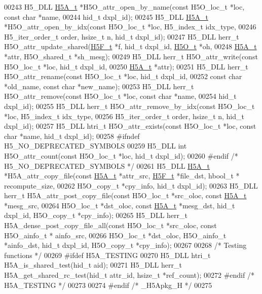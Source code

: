 \begin{DoxyCode}
00243 H5\_DLL \hyperlink{struct_h5_a__t}{H5A\_t} *H5O\_attr\_open\_by\_name(\textcolor{keyword}{const} H5O\_loc\_t *loc, \textcolor{keyword}{const} \textcolor{keywordtype}{char} *name,
00244     hid\_t dxpl\_id);
00245 H5\_DLL \hyperlink{struct_h5_a__t}{H5A\_t} *H5O\_attr\_open\_by\_idx(\textcolor{keyword}{const} H5O\_loc\_t *loc, H5\_index\_t idx\_type,
00246     H5\_iter\_order\_t order, hsize\_t n, hid\_t dxpl\_id);
00247 H5\_DLL herr\_t H5O\_attr\_update\_shared(\hyperlink{struct_h5_f__t}{H5F\_t} *f, hid\_t dxpl\_id, \hyperlink{struct_h5_o__t}{H5O\_t} *oh,
00248         \hyperlink{struct_h5_a__t}{H5A\_t} *attr, H5O\_shared\_t *sh\_mesg);
00249 H5\_DLL herr\_t H5O\_attr\_write(\textcolor{keyword}{const} H5O\_loc\_t *loc, hid\_t dxpl\_id,
00250     \hyperlink{struct_h5_a__t}{H5A\_t} *attr);
00251 H5\_DLL herr\_t H5O\_attr\_rename(\textcolor{keyword}{const} H5O\_loc\_t *loc, hid\_t dxpl\_id,
00252     \textcolor{keyword}{const} \textcolor{keywordtype}{char} *old\_name, \textcolor{keyword}{const} \textcolor{keywordtype}{char} *new\_name);
00253 H5\_DLL herr\_t H5O\_attr\_remove(\textcolor{keyword}{const} H5O\_loc\_t *loc, \textcolor{keyword}{const} \textcolor{keywordtype}{char} *name,
00254     hid\_t dxpl\_id);
00255 H5\_DLL herr\_t H5O\_attr\_remove\_by\_idx(\textcolor{keyword}{const} H5O\_loc\_t *loc, H5\_index\_t idx\_type,
00256     H5\_iter\_order\_t order, hsize\_t n, hid\_t dxpl\_id);
00257 H5\_DLL htri\_t H5O\_attr\_exists(\textcolor{keyword}{const} H5O\_loc\_t *loc, \textcolor{keyword}{const} \textcolor{keywordtype}{char} *name, hid\_t dxpl\_id);
00258 \textcolor{preprocessor}{#ifndef H5\_NO\_DEPRECATED\_SYMBOLS}
00259 H5\_DLL \textcolor{keywordtype}{int} H5O\_attr\_count(\textcolor{keyword}{const} H5O\_loc\_t *loc, hid\_t dxpl\_id);
00260 \textcolor{preprocessor}{#endif }\textcolor{comment}{/* H5\_NO\_DEPRECATED\_SYMBOLS */}\textcolor{preprocessor}{}
00261 H5\_DLL \hyperlink{struct_h5_a__t}{H5A\_t} *H5A\_attr\_copy\_file(\textcolor{keyword}{const} \hyperlink{struct_h5_a__t}{H5A\_t} *attr\_src, \hyperlink{struct_h5_f__t}{H5F\_t} *file\_dst, hbool\_t *
      recompute\_size,
00262     H5O\_copy\_t *cpy\_info, hid\_t dxpl\_id);
00263 H5\_DLL herr\_t H5A\_attr\_post\_copy\_file(\textcolor{keyword}{const} H5O\_loc\_t *src\_oloc, \textcolor{keyword}{const} \hyperlink{struct_h5_a__t}{H5A\_t} *mesg\_src,
00264     H5O\_loc\_t *dst\_oloc, \textcolor{keyword}{const} \hyperlink{struct_h5_a__t}{H5A\_t} *mesg\_dst, hid\_t dxpl\_id, H5O\_copy\_t *cpy\_info);
00265 H5\_DLL herr\_t H5A\_dense\_post\_copy\_file\_all(\textcolor{keyword}{const} H5O\_loc\_t *src\_oloc, \textcolor{keyword}{const} H5O\_ainfo\_t * ainfo\_src,
00266     H5O\_loc\_t *dst\_oloc, H5O\_ainfo\_t *ainfo\_dst, hid\_t dxpl\_id, H5O\_copy\_t *cpy\_info);
00267 
00268 \textcolor{comment}{/* Testing functions */}
00269 \textcolor{preprocessor}{#ifdef H5A\_TESTING}
00270 H5\_DLL htri\_t H5A\_is\_shared\_test(hid\_t aid);
00271 H5\_DLL herr\_t H5A\_get\_shared\_rc\_test(hid\_t attr\_id, hsize\_t *ref\_count);
00272 \textcolor{preprocessor}{#endif }\textcolor{comment}{/* H5A\_TESTING */}\textcolor{preprocessor}{}
00273 
00274 \textcolor{preprocessor}{#endif }\textcolor{comment}{/* \_H5Apkg\_H */}\textcolor{preprocessor}{}
00275 
\end{DoxyCode}
